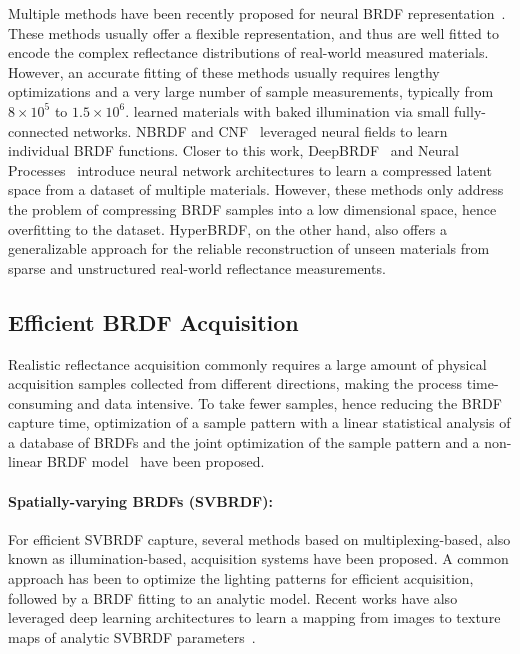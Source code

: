 Multiple methods have been recently proposed for neural BRDF representation~\cite{rainer2019neural, hu2020deepbrdf, sztrajman2021neural, zheng2021compact, maximov2019deep, chen2021invertible, fan2021neural, cnf2023}. These methods usually offer a flexible representation, and thus are well fitted to encode the complex reflectance distributions of real-world measured materials. However, an accurate fitting of these methods usually requires lengthy optimizations and a very large number of sample measurements, typically from $8 \times 10^5$ to $1.5 \times 10^6$. \cite{maximov2019deep} learned materials with baked illumination via small fully-connected networks. NBRDF \cite{sztrajman2021neural} and CNF~\cite{cnf2023} leveraged neural fields to learn individual BRDF functions. Closer to this work, DeepBRDF~\cite{hu2020deepbrdf} and Neural Processes~\cite{zheng2021compact} introduce neural network architectures to learn a compressed latent space from a dataset of multiple materials. However, these methods only address the problem of compressing BRDF samples into a low dimensional space, hence overfitting to the dataset. HyperBRDF, on the other hand, also offers a generalizable approach for the reliable reconstruction of unseen materials from sparse and unstructured real-world reflectance measurements.


\subsection{Efficient BRDF Acquisition}
Realistic reflectance acquisition commonly requires a large amount of physical acquisition samples collected from different directions, making the process time-consuming and data intensive. To take fewer samples, hence reducing the BRDF capture time, optimization of a sample pattern with a linear statistical analysis of a database of BRDFs \cite{nielsen2015optimal} and the joint optimization of the sample pattern and a non-linear BRDF model~\cite{liu2023learning} have been proposed.

\paragraph{Spatially-varying BRDFs (SVBRDF):} For efficient SVBRDF capture, several methods based on multiplexing-based, also known as illumination-based, acquisition systems \cite{kang2018efficient, kang2019learning, ma2021free, ma2023opensvbrdf, tunwattanapong2013acquiring} have been proposed. A common approach has been to optimize the lighting patterns for efficient acquisition, followed by a BRDF fitting to an analytic model. Recent works have also leveraged deep learning architectures to learn a mapping from images to texture maps of analytic SVBRDF parameters~\cite{guo2021highlight, hui2017reflectance, deschaintre2018single, deschaintre2019flexible, martin2022materia, zhou2021adversarial,gao2019deep}. 

